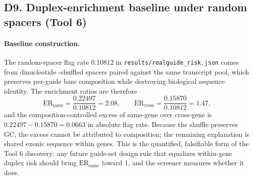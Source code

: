 \subsection{D9. Duplex-enrichment baseline under random spacers (Tool 6)}
\paragraph{Baseline construction.} The random-spacer flag rate
$0.10812$ in \texttt{results/realguide\_risk.json} comes from dinucleotide
-shuffled spacers paired against the same transcript pool, which preserves
per-guide base composition while destroying biological sequence identity.
The enrichment ratios are therefore
\begin{equation}
\text{ER}_{\text{same}} = \frac{0.22497}{0.10812} = 2.08,
\qquad
\text{ER}_{\text{cross}} = \frac{0.15870}{0.10812} = 1.47,
\end{equation}
and the composition-controlled excess of same-gene over cross-gene is
$0.22497 - 0.15870 = 0.0663$ in absolute flag rate. Because the shuffle
preserves GC, the excess cannot be attributed to composition; the
remaining explanation is shared exonic sequence within genes. This is the
quantified, falsifiable form of the Tool 6 discovery: any future guide-set
design rule that equalizes within-gene duplex risk should bring
$\text{ER}_{\text{same}}$ toward 1, and the screener measures whether it
does.
